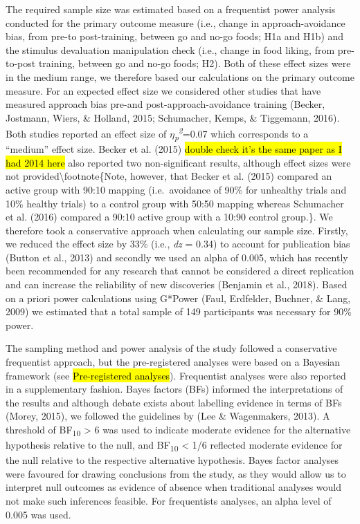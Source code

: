 \documentclass[man,floatsintext]{apa6}
\begin{document}
The required sample size was estimated based on a frequentist power analysis conducted for the primary outcome measure (i.e., change in approach-avoidance bias, from pre-to post-training, between go and no-go foods; H1a and H1b) and the stimulus devaluation manipulation check (i.e., change in food liking, from pre-to-post training, between go and no-go foods; H2). Both of these effect sizes were in the medium range, we therefore based our calculations on the primary outcome measure. For an expected effect size we considered other studies that have measured approach bias pre-and post-approach-avoidance training (Becker, Jostmann, Wiers, \& Holland, 2015; Schumacher, Kemps, \& Tiggemann, 2016). Both studies reported an effect size of \textit{$\eta$\textsubscript{p}\textsuperscript{2}}=0.07 which corresponds to a \enquote{medium} effect size. Becker et al. (2015) \hl{double check it's the same paper as I had 2014 here} also reported two non-significant results, although effect sizes were not provided\textbackslash footnote\{Note, however, that Becker et al. (2015) compared an active group with 90:10 mapping (i.e.~avoidance of 90\% for unhealthy trials and 10\% healthy trials) to a control group with 50:50 mapping whereas Schumacher et al. (2016) compared a 90:10 active group with a 10:90 control group.\}. We therefore took a conservative approach when calculating our sample size. Firstly, we reduced the effect size by 33\% (i.e., \textit{dz} = 0.34) to account for publication bias (Button et al., 2013) and secondly we used an alpha of 0.005, which has recently been recommended for any research that cannot be considered a direct replication and can increase the reliability of new discoveries (Benjamin et al., 2018). Based on a priori power calculations using G*Power (Faul, Erdfelder, Buchner, \& Lang, 2009) we estimated that a total sample of 149 participants was necessary for 90\% power.

\par

The sampling method and power analysis of the study followed a conservative frequentist approach, but the pre-registered analyses were based on a Bayesian framework (see \hl{Pre-registered analyses}). Frequentist analyses were also reported in a supplementary fashion. Bayes factors (BFs) informed the interpretations of the results and although debate exists about labelling evidence in terms of BFs (Morey, 2015), we followed the guidelines by (Lee \& Wagenmakers, 2013). A threshold of BF\textsubscript{10} \textgreater{} 6 was used to indicate moderate evidence for the alternative hypothesis relative to the null, and BF\textsubscript{10} \textless{} 1/6 reflected moderate evidence for the null relative to the respective alternative hypothesis. Bayes factor analyses were favoured for drawing conclusions from the study, as they would allow us to interpret null outcomes as evidence of absence when traditional analyses would not make such inferences feasible. For frequentists analyses, an alpha level of 0.005 was used.
\end{document}
